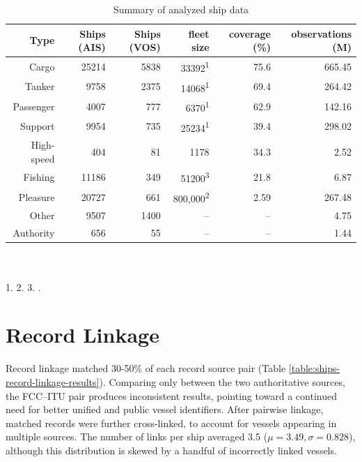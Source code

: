 \begin{table}[htbp]
  \caption[Summary of analyzed ship data]{Summary of analyzed ship data}
  \hspace*{-0.2in}
  \begin{tabular}{rrrrrr} %
    \hline
    \small{Type} & \small{Ships \textsf{(AIS)}} & \small{Ships \textsf{(VOS)}} & \small{fleet size} & \small{coverage} (\%) & \small{observations} (M) \\
    \hline
    Cargo & 25214 & 5838 & 33392\textsuperscript{1} & 75.6 & 665.45 \\
    Tanker & 9758 & 2375 & 14068\textsuperscript{1} & 69.4 & 264.42 \\
    Passenger & 4007 & 777 & 6370\textsuperscript{1} & 62.9 & 142.16 \\
    Support & 9954 & 735 & 25234\textsuperscript{1} & 39.4 & 298.02 \\
    High-speed & 404 & 81 & 1178 & 34.3 & 2.52 \\
    Fishing & 11186 & 349 & 51200\textsuperscript{3} & 21.8 & 6.87 \\
    Pleasure & 20727 & 661 & 800,000\textsuperscript{2} & 2.59 & 267.48 \\
    Other & 9507 & 1400 & -- & -- & 4.75 \\
    Authority & 656 & 55 & -- & -- & 1.44 \\
  \end{tabular}
\\
\\
  \small{1. \cite{Equasis2011} 2. \cite{westwood2001global} 3. \cite{FAOfishing}.}
  \label{table:ships-by-type}
\end{table}


\section{Record Linkage}

Record linkage matched 30-50\% of each record source pair (Table \ref{table:ships-record-linkage-results}). Comparing only between the two authoritative sources, the FCC--ITU pair produces inconsistent results, pointing toward a continued need for better unified and public vessel identifiers.  After pairwise linkage, matched records were further cross-linked, %
 to account for vessels appearing in multiple sources. The number of links per ship averaged 3.5 ($\mu = 3.49, \sigma = 0.828$), %
although this distribution is skewed by a handful of incorrectly linked vessels.

